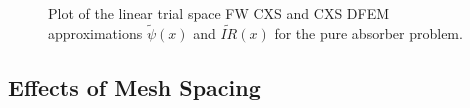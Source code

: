 \begin{figure}[!htp]
\begin{center}
\end{center}
\caption{Plot of the linear trial space FW CXS and CXS DFEM approximations $\widetilde{\psi}(x)$ and $\widetilde{IR}(x)$ for the pure absorber problem.}
\label{fig:fw_blading}
\end{figure}



\subsection{Effects of Mesh Spacing}

